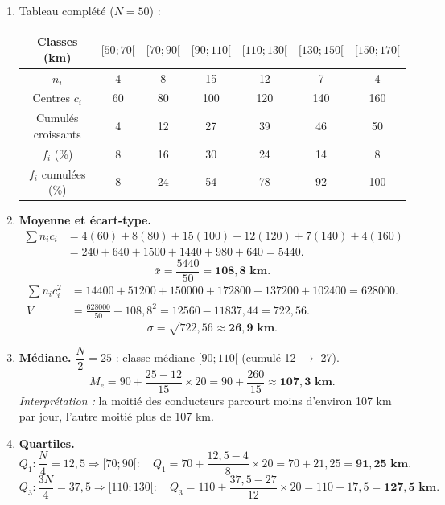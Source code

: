 \documentclass[11pt]{article}
\begin{document}
\begin{corrige}
\begin{enumerate}
    \item Tableau complété ($N = 50$) :
    \begin{center}
    \begin{tabular}{|c|c|c|c|c|c|c|}\hline
    Classes (km) & $[50;70[$ & $[70;90[$ & $[90;110[$ & $[110;130[$ & $[130;150[$ & $[150;170[$ \\ \hline
    $n_i$ & 4 & 8 & 15 & 12 & 7 & 4 \\ \hline
    Centres $c_i$ & 60 & 80 & 100 & 120 & 140 & 160 \\ \hline
    Cumulés croissants & 4 & 12 & 27 & 39 & 46 & 50 \\ \hline
    $f_i$ (\%) & 8 & 16 & 30 & 24 & 14 & 8 \\ \hline
    $f_i$ cumulées (\%) & 8 & 24 & 54 & 78 & 92 & 100 \\ \hline
    \end{tabular}
    \end{center}
    \item \textbf{Moyenne et écart-type.}
    \begin{align*}
    \sum n_i c_i &= 4(60)+8(80)+15(100)+12(120)+7(140)+4(160)\\
    &= 240+640+1500+1440+980+640 = 5440.
    \end{align*}
    \[ \bar{x} = \frac{5440}{50} = \mathbf{108{,}8 \text{ km}}. \]
    \begin{align*}
    \sum n_i c_i^2 &= 14400+51200+150000+172800+137200+102400 = 628000.\\
    V &= \frac{628000}{50} - 108{,}8^2 = 12560 - 11837{,}44 = 722{,}56.
    \end{align*}
    \[ \sigma = \sqrt{722{,}56} \approx \mathbf{26{,}9 \text{ km}}. \]
    \item \textbf{Médiane.} $\dfrac{N}{2} = 25$ : classe médiane $[90;110[$ (cumulé 12 $\to$ 27).
    \[ M_e = 90 + \frac{25-12}{15}\times 20 = 90 + \frac{260}{15} \approx \mathbf{107{,}3 \text{ km}}. \]
    \emph{Interprétation :} la moitié des conducteurs parcourt moins d'environ 107 km par jour, l'autre moitié plus de 107 km.
    \item \textbf{Quartiles.}
    \[ Q_1 : \frac{N}{4} = 12{,}5 \Rightarrow [70;90[ : \quad Q_1 = 70 + \frac{12{,}5-4}{8}\times 20 = 70 + 21{,}25 = \mathbf{91{,}25 \text{ km}}. \]
    \[ Q_3 : \frac{3N}{4} = 37{,}5 \Rightarrow [110;130[ : \quad Q_3 = 110 + \frac{37{,}5-27}{12}\times 20 = 110 + 17{,}5 = \mathbf{127{,}5 \text{ km}}. \]

\end{enumerate}
\end{corrige}
\end{document}
